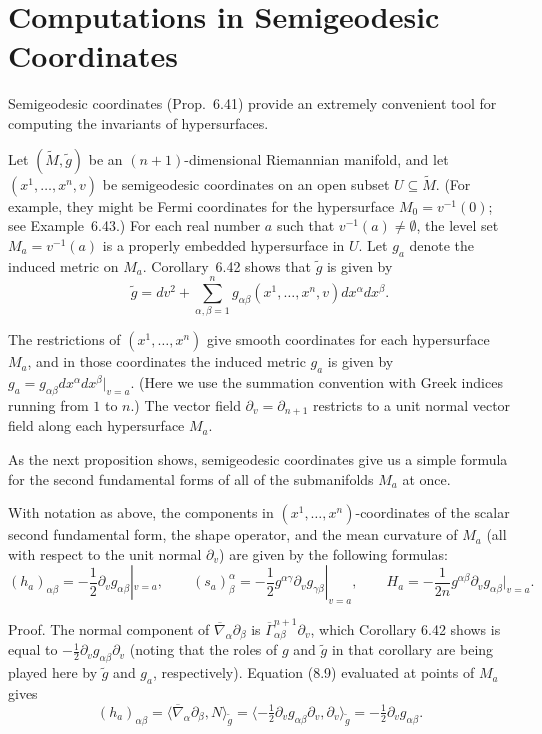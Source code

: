 \section{Computations in Semigeodesic Coordinates}

Semigeodesic coordinates (Prop.~6.41) provide an extremely convenient tool for computing the invariants of hypersurfaces.

Let $(\tilde{M}, \tilde{g})$ be an $(n+1)$-dimensional Riemannian manifold, and let $(x^1, \ldots, x^n, v)$ be semigeodesic coordinates on an open subset $U \subseteq \tilde{M}$. (For example, they might be Fermi coordinates for the hypersurface $M_0 = v^{-1}(0)$; see Example~6.43.) For each real number $a$ such that $v^{-1}(a) \ne \emptyset$, the level set $M_a = v^{-1}(a)$ is a properly embedded hypersurface in $U$. Let $g_a$ denote the induced metric on $M_a$. Corollary~6.42 shows that $\tilde{g}$ is given by
\begin{equation}
\tilde{g} = dv^2 + \sum_{\alpha,\beta=1}^n g_{\alpha\beta}(x^1, \ldots, x^n, v) dx^\alpha dx^\beta.
\tag{8.13}
\end{equation}

The restrictions of $(x^1, \ldots, x^n)$ give smooth coordinates for each hypersurface $M_a$, and in those coordinates the induced metric $g_a$ is given by $g_a = g_{\alpha\beta} dx^\alpha dx^\beta|_{v=a}$. (Here we use the summation convention with Greek indices running from $1$ to $n$.) The vector field $\partial_v = \partial_{n+1}$ restricts to a unit normal vector field along each hypersurface $M_a$.

As the next proposition shows, semigeodesic coordinates give us a simple formula for the second fundamental forms of all of the submanifolds $M_a$ at once.

\begin{proposition}
\label{prop:semigeodesic-coordinates-second-form}
With notation as above, the components in $(x^1, \ldots, x^n)$-coordinates of the scalar second fundamental form, the shape operator, and the mean curvature of $M_a$ (all with respect to the unit normal $\partial_v$) are given by the following formulas:
\[
(h_a)_{\alpha\beta} = -\frac{1}{2} \partial_v g_{\alpha\beta}|_{v=a}, \qquad
(s_a)_\beta^\alpha = -\frac{1}{2}g^{\alpha\gamma}\partial_v g_{\gamma\beta}|_{v=a}, \qquad
H_a = -\frac{1}{2n}g^{\alpha\beta}\partial_v g_{\alpha\beta}|_{v=a}.
\]
\end{proposition}

Proof. The normal component of $\overline{\nabla}_\alpha \partial_\beta$ is $\overline{\Gamma}^{n+1}_{\alpha\beta}\partial_v$, which Corollary 6.42 shows is equal to $-\frac{1}{2}\partial_v g_{\alpha\beta}\partial_v$ (noting that the roles of $g$ and $\tilde{g}$ in that corollary are being played here by $\tilde{g}$ and $g_a$, respectively). Equation (8.9) evaluated at points of $M_a$ gives
\[
(h_a)_{\alpha\beta} = \langle \overline{\nabla}_\alpha \partial_\beta, N \rangle_{\tilde{g}} = \langle -\tfrac{1}{2}\partial_v g_{\alpha\beta}\partial_v, \partial_v \rangle_{\tilde{g}} = -\tfrac{1}{2}\partial_v g_{\alpha\beta}.
\]

